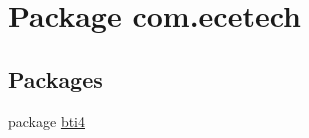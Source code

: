 \hypertarget{namespacecom_1_1ecetech}{}\section{Package com.\+ecetech}
\label{namespacecom_1_1ecetech}
\subsection*{Packages}
\begin{DoxyCompactItemize}
\item 
package \hyperlink{namespacecom_1_1ecetech_1_1bti4}{bti4}
\end{DoxyCompactItemize}
